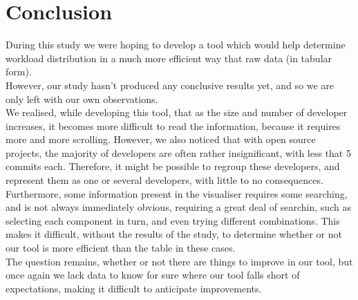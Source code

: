 \section{Conclusion}
	During this study we were hoping to develop a tool which would help determine workload distribution in a much more efficient way that raw data (in tabular form).\\
	However, our study hasn't produced any conclusive results yet, and so we are only left with our own observations.\\
	We realised, while developing this tool, that as the size and number of developer increases, it becomes more difficult to read the information, because it requires more and more scrolling. However, we also noticed that with open source projects, the majority of developers are often rather insignificant, with less that 5 commits each. Therefore, it might be possible to regroup these developers, and represent them as one or several developers, with little to no consequences.\\

	Furthermore, some information present in the visualiser requires some searching, and is not always immediately obvious, requiring a great deal of searchin, such as selecting each component in turn, and even trying different combinations. This makes it difficult, without the results of the study, to determine whether or not our tool is more efficient than the table in these cases.\\

	The question remains, whether or not there are things to improve in our tool, but once again we lack data to know for sure where our tool falls short of expectations, making it difficult to anticipate improvements.